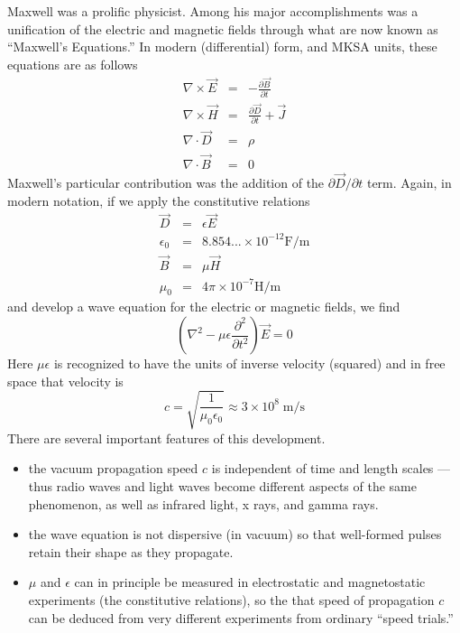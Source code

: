 Maxwell was a prolific physicist.  Among his major accomplishments was
a unification of the electric and magnetic fields through what are now
known as ``Maxwell's Equations.''  In modern (differential) form, and MKSA units,
these equations are as follows
\begin{eqnarray}
\nabla\times \vec{E} &=& -\frac{\partial \vec{B}}{\partial t} \\
\nabla\times \vec{H} &=&  \frac{\partial \vec{D}}{\partial t} + \vec{J} \\
\nabla\cdot \vec{D}  &=& \rho \\
\nabla\cdot \vec{B}  &=& 0
\end{eqnarray}
Maxwell's particular contribution was the addition of the $\partial
\vec{D}/\partial t$ term.  Again, in modern notation, if we apply the
constitutive relations
\begin{eqnarray}
\vec{D}    &=& \epsilon \vec{E} \\
\epsilon_0 &=& 8.854...\times 10^{-12} \textrm{F/m} \\
\vec{B}    &=& \mu \vec{H} \\
\mu_0      &=& 4\pi \times 10^{-7} \textrm{H/m}
\end{eqnarray}
and develop a wave equation for the electric or magnetic fields, we
find
\begin{equation}
\left(\nabla^2 - \mu \epsilon \frac{\partial^2}{\partial t^2}\right) \vec{E}  = 0
\end{equation}
Here $\mu \epsilon$ is recognized to have the units of inverse
velocity (squared) and in free space that velocity is
\begin{equation}
c = \sqrt{\frac{1}{\mu_0 \epsilon_0}} \approx 3 \times 10^8 \;
\textrm{m/s}
\end{equation}
There are several important features of this development.
\begin{itemize}
\item the vacuum propagation speed $c$ is independent of time and
length scales --- thus radio waves and light waves become different
aspects of the same phenomenon, as well as infrared light, x rays, and
gamma rays.
\item the wave equation is not dispersive (in vacuum) so that
well-formed pulses retain their shape as they propagate.  
\item $\mu$ and $\epsilon$ can in principle be measured in
electrostatic and magnetostatic experiments (the constitutive
relations), so the that speed of propagation $c$ can be deduced from
very different experiments from ordinary ``speed trials.''
\end{itemize}
